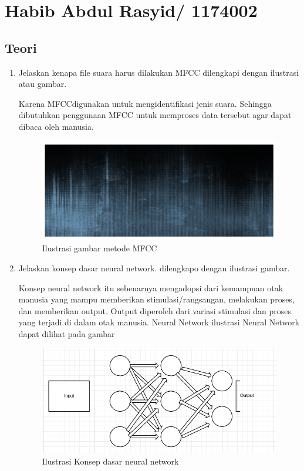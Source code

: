 \section{Habib Abdul Rasyid/ 1174002}
\subsection{Teori}

\begin{enumerate}

\item Jelaskan kenapa file suara harus dilakukan MFCC dilengkapi dengan ilustrasi atau gambar.\par
Karena MFCCdigunakan untuk mengidentifikasi jenis suara.
Sehingga dibutuhkan penggunaan MFCC untuk memproses data tersebut agar dapat dibaca oleh manusia.
\begin{figure}[ht]
\centering
\includegraphics[scale=0.3]{figures/1174002/chapter6/1,1.PNG}
\caption{Ilustrasi gambar metode MFCC}
\label{contoh}
\end{figure}


\item Jelaskan konsep dasar neural network. dilengkapo dengan ilustrasi gambar. \par
Konsep neural network itu sebenarnya mengadopsi dari kemampuan otak manusia yang mampu memberikan stimulasi/rangsangan, 
melakukan proses, dan memberikan output. Output diperoleh dari variasi stimulasi dan proses yang terjadi di dalam otak manusia.
Neural Network 
        ilustrasi Neural Network dapat dilihat pada gambar
        

\begin{figure}[ht]
\centering
\includegraphics[scale=0.3]{figures/1174002/chapter6/1,2.PNG}
\caption{Ilustrasi Konsep dasar neural network}
\label{contoh}
\end{figure}



\end{enumerate}
